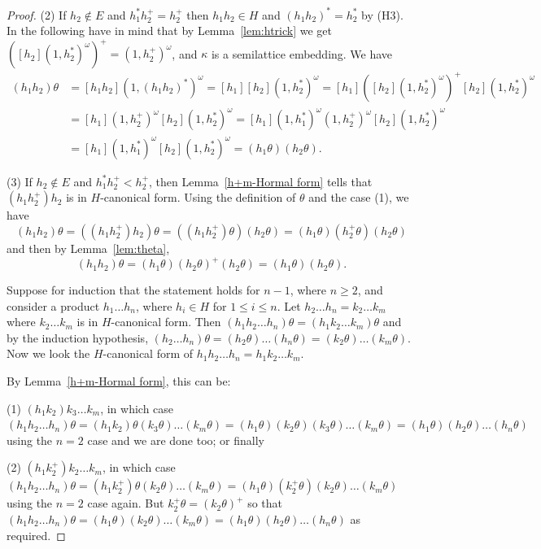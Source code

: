 \documentclass[12pt]{amsart}
\theoremstyle{definition}
\theoremstyle{definition}
\numberwithin{them}{section}
\numberwithin{equation}{section}
\begin{document}
{{\begin{proof}
(2)
If $h_2\notin E$  and $h_1^* h_2^+= h_2^+$  then $h_1h_2 \in H$ and $(h_1h_2)^* = h_2^*$ by (H3). In the following have in mind that by Lemma~\ref{lem:htrick}  we  get $([h_2](1, h_2^*)^\omega)^+ = (1,h_2^+)^\omega$, and $\kappa$ is a semilattice embedding. We have   
\[
\begin{aligned}
(h_1h_2)\theta & = [h_1h_2](1, (h_1h_2)^*)^\omega
               =[h_1][h_2](1, h_2^*)^\omega=[h_1]([h_2](1, h_2^*)^\omega)^+[h_2](1, h_2^*)^\omega\\
               &=[h_1](1,h_2^+)^\omega[h_2](1, h_2^*)^\omega=[h_1](1,h_1^*)^\omega(1,h_2^+)^\omega[h_2](1, h_2^*)^\omega\\
               &=[h_1](1,h_1^*)^\omega[h_2](1, h_2^*)^\omega=(h_1\theta )(h_2\theta).
\end{aligned}
\]

(3)  If $h_2 \notin E$ and  $h_1^* h_2^+< h_2^+$,  then  Lemma~\ref{h+m-Hormal form} tells that  $(h_1h_2^+)h_2$ is in $H$-canonical form.  Using  the definition of $\theta$ and the case (1),   we have  \[(h_1h_2)\theta = ((h_1h_2^+)h_2)\theta =((h_1h_2^+)\theta )(h_2\theta)=(h_1\theta)(h_2^+\theta)(h_2\theta)\]
and then 
by Lemma~\ref{lem:theta},
\[(h_1h_2)\theta=(h_1\theta)(h_2\theta)^+(h_2\theta)=(h_1\theta)(h_2\theta).\]

Suppose for induction that  the statement holds  for $n-1$, where $n\geq 2$,  and consider a product
$h_1\dots h_n$, where $h_i\in H$ for $1\leq i\leq n$. 
Let $h_2\dots h_n = k_2\dots k_m$ where $k_2\dots k_m$  is in $H$-canonical form. Then $(h_1h_2\dots h_n)\theta = (h_1k_2\dots k_m)\theta$ and by the induction hypothesis,  $(h_2\dots h_n)\theta=(h_2\theta)\dots (h_n\theta)= (k_2\theta) \dots (k_m\theta)$. Now we look the $H$-canonical form of $h_1h_2\dots h_n=h_1k_2\dots k_m$. 
 
By Lemma~\ref{h+m-Hormal form}, this can be:

(1) $(h_1k_2)k_3\dots k_m$, in which case  
$(h_1h_2\dots h_n)\theta=  (h_1k_2)\theta (k_3\theta) \dots (k_m\theta)=(h_1\theta)( k_2\theta) (k_3\theta) \dots (k_m\theta)=(h_1\theta)(h_2\theta) \dots (h_n\theta)$ using the  $n=2$ case  and we are done too; or finally


(2) $(h_1k_2^+)k_2\dots k_m$, in which case 
$(h_1h_2\dots h_n)\theta=(h_1k_2^+)\theta (k_2\theta )\dots( k_m\theta)=(h_1\theta)(k_2^+\theta) (k_2\theta )\dots( k_m\theta)$ using the  $n=2$ case again. But $k_2^+\theta =(k_2\theta)^+$ so that $(h_1h_2\dots h_n)\theta= (h_1\theta) (k_2\theta )\dots( k_m\theta)=(h_1\theta)(h_2\theta) \dots (h_n\theta)$ as required.


\end{proof}}}
\end{document}
